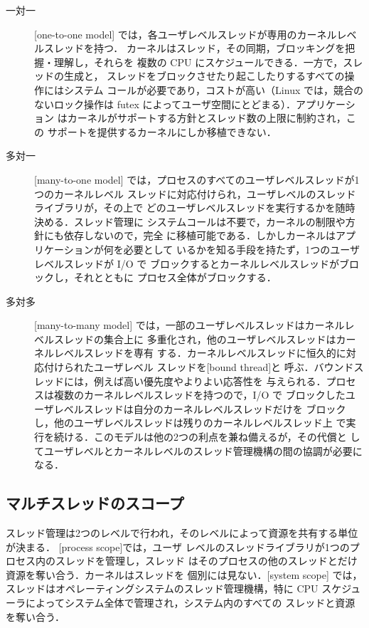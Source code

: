 \documentclass[../main.tex]{subfiles}
\begin{document}
\begin{description}
  \item[一対一] [one-to-one model]%
    では，各ユーザレベルスレッドが専用のカーネルレベルスレッドを持つ．
    カーネルはスレッド，その同期，ブロッキングを把握・理解し，それらを
    複数の CPU にスケジュールできる．一方で，スレッドの生成と，
    スレッドをブロックさせたり起こしたりするすべての操作にはシステム
    コールが必要であり，コストが高い（Linux では，競合のないロック操作は
    futex によってユーザ空間にとどまる）．アプリケーション
    はカーネルがサポートする方針とスレッド数の上限に制約され，この
    サポートを提供するカーネルにしか移植できない．
  \item[多対一] [many-to-one model]%
    では，プロセスのすべてのユーザレベルスレッドが1つのカーネルレベル
    スレッドに対応付けられ，ユーザレベルのスレッドライブラリが，その上で
    どのユーザレベルスレッドを実行するかを随時決める．スレッド管理に
    システムコールは不要で，カーネルの制限や方針にも依存しないので，完全
    に移植可能である．しかしカーネルはアプリケーションが何を必要として
    いるかを知る手段を持たず，1つのユーザレベルスレッドが I/O で
    ブロックするとカーネルレベルスレッドがブロックし，それとともに
    プロセス全体がブロックする．
  \item[多対多] [many-to-many model]%
    では，一部のユーザレベルスレッドはカーネルレベルスレッドの集合上に
    多重化され，他のユーザレベルスレッドはカーネルレベルスレッドを専有
    する．カーネルレベルスレッドに恒久的に対応付けられたユーザレベル
    スレッドを[bound thread]と
    呼ぶ．バウンドスレッドには，例えば高い優先度やよりよい応答性を
    与えられる．プロセスは複数のカーネルレベルスレッドを持つので，I/O で
    ブロックしたユーザレベルスレッドは自分のカーネルレベルスレッドだけを
    ブロックし，他のユーザレベルスレッドは残りのカーネルレベルスレッド上
    で実行を続ける．このモデルは他の2つの利点を兼ね備えるが，その代償と
    してユーザレベルとカーネルレベルのスレッド管理機構の間の協調が必要に
    なる．
\end{description}


\subsection{マルチスレッドのスコープ}

スレッド管理は2つのレベルで行われ，そのレベルによって資源を共有する単位
が決まる．
[process scope]では，ユーザ
レベルのスレッドライブラリが1つのプロセス内のスレッドを管理し，スレッド
はそのプロセスの他のスレッドとだけ資源を奪い合う．カーネルはスレッドを
個別には見ない．[system scope]%
では，スレッドはオペレーティングシステムのスレッド管理機構，特に CPU
スケジューラによってシステム全体で管理され，システム内のすべての
スレッドと資源を奪い合う．
\end{document}
